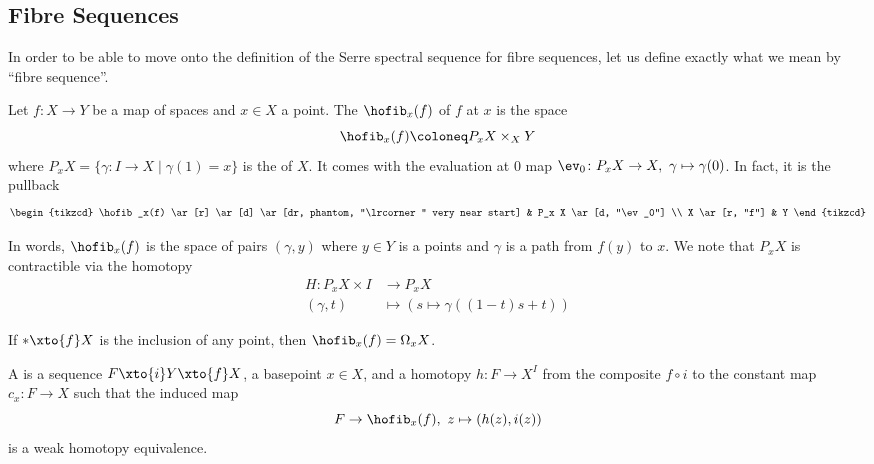 \documentclass[wip, topology]{bsteffan-lecturenotes}
\begin{document}
\subsection{Fibre Sequences}
In order to be able to move onto the definition of the Serre spectral sequence for fibre sequences, let us define exactly what we mean by \enquote{fibre sequence}.
\begin{definition}
	Let $f\colon X \to Y$ be a map of spaces and $x \in X$ a point.
	The  $\hofib_x(f)$ of $f$ at $x$ is the space
	\begin{equation*}
		\hofib_x(f) \coloneq P_x X \times_X Y
	\end{equation*}
	where $P_x X = \{\gamma\colon I \to X \mid \gamma(1) = x\}$ is the  of $X$.
	It comes with the evaluation at 0 map $\ev_0\colon P_x X \to X,\ \gamma \mapsto \gamma(0)$.
	In fact, it is the pullback
	\begin{equation*}
		\begin{tikzcd}
			\hofib_x(f)
					\ar[r]
					\ar[d]
					\ar[dr, phantom, "\lrcorner" very near start]
				& P_x X
					\ar[d, "\ev_0"]
			\\
			X 
					\ar[r, "f"]
				& Y
		\end{tikzcd}
	\end{equation*}
\end{definition}
In words, $\hofib_x(f)$ is the space of pairs $(\gamma, y)$ where $y \in Y$ is a points and $\gamma$ is a path from $f(y)$ to $x$.
We note that $P_x X$ is contractible via the homotopy
\begin{align*}
	H\colon P_x X \times I &\to P_x X \\
	(\gamma, t) &\mapsto (s \mapsto \gamma((1 - t)s + t))
\end{align*}
\begin{example}
	If $* \xto{f} X$ is the inclusion of any point, then $\hofib_x(f) = \Omega_x X$.
\end{example}
\begin{definition}
	A  is a sequence $F \xto{i} Y \xto{f} X$, a basepoint $x \in X$, and a homotopy $h\colon F \to X^I$ from the composite $f \circ i$ to the constant map $c_x\colon F \to X$ such that the induced map
	\begin{equation*}
		F \to \hofib_x(f),\ z \mapsto (h(z), i(z))
	\end{equation*}
	is a weak homotopy equivalence.
\end{definition}
\end{document}

